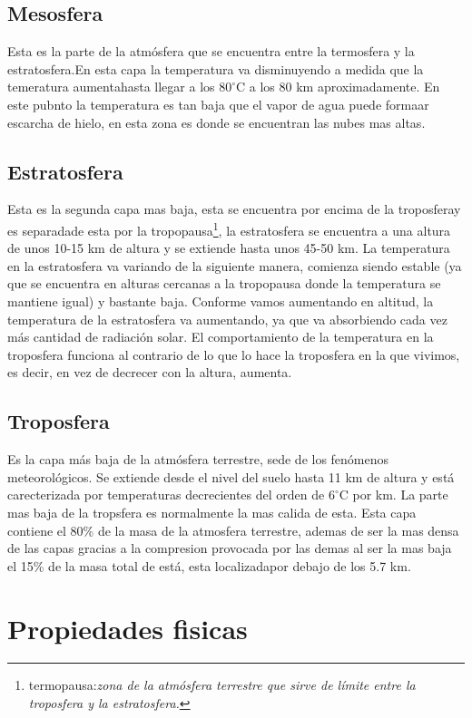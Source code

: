 \documentclass{article}
\begin{document}
\subsection{Mesosfera}
Esta es la parte de la atmósfera que se encuentra entre la termosfera y la estratosfera.En esta capa la temperatura va disminuyendo a medida que la temeratura aumentahasta llegar a los $80^{\circ}$C a los 80 km aproximadamente.
\newline
En este pubnto la temperatura es tan baja que el vapor de agua puede formaar escarcha de hielo, en esta zona es donde se encuentran las nubes mas altas.

\subsection{Estratosfera}
Esta es la segunda capa mas baja, esta se encuentra por encima de la troposferay es separadade esta por la tropopausa\footnote {termopausa:\textit{zona de la atmósfera terrestre que sirve de límite entre la troposfera y la estratosfera.}}, la estratosfera se encuentra a una altura de unos 10-15 km de altura y se extiende hasta unos 45-50 km. La temperatura en la estratosfera va variando de la siguiente manera, comienza siendo estable (ya que se encuentra en alturas cercanas a la tropopausa donde la temperatura se mantiene igual) y bastante baja. Conforme vamos aumentando en altitud, la temperatura de la estratosfera va aumentando, ya que va absorbiendo cada vez más cantidad de radiación solar. El comportamiento de la temperatura en la troposfera funciona al contrario de lo que lo hace la troposfera en la que vivimos, es decir, en vez de decrecer con la altura, aumenta.

\subsection{Troposfera}
Es la capa más baja de la atmósfera terrestre, sede de los fenómenos meteorológicos. Se extiende desde el nivel del suelo hasta 11 km de altura y está carecterizada por temperaturas decrecientes del orden de $6^{\circ}$C por km.
\newline
La parte mas baja de la tropsfera es normalmente la mas calida de esta. Esta capa contiene el 80\% de la masa de la atmosfera terrestre, ademas de ser la mas densa de las capas gracias a la compresion provocada por las demas al ser la mas baja el 15\% de la masa total de está, esta localizadapor debajo de los 5.7 km.

\section{Propiedades fisicas}
\end{document}
